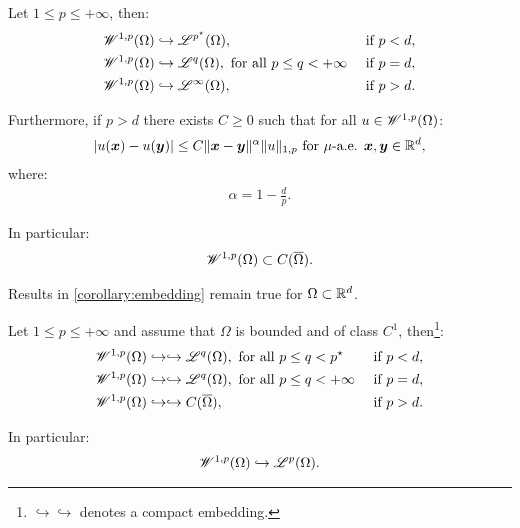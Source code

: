 \begin{corollary}
    Let $1 \leq p \leq +\infty$, then:
    \begin{align}
        & \mathscr{W}^{1, p}(\Omega) \hookrightarrow \mathscr{L}^{p^{\star}}(\Omega), & \text{ if } p < d, \\
        & \mathscr{W}^{1, p}(\Omega) \hookrightarrow \mathscr{L}^{q}(\Omega), \text{ for all } p \leq q < +\infty & \text{ if } p = d, \\
        & \mathscr{W}^{1, p}(\Omega) \hookrightarrow \mathscr{L}^{\infty}(\Omega), & \text{ if } p > d.
    \end{align}

    Furthermore, if $p > d$ there exists $C \geq 0$ such that for all $u \in \mathscr{W}^{1, p}(\Omega)$:
    \begin{gather}
        \lvert u(\bm{x}) - u(\bm{y}) \rvert \leq C \lVert \bm{x} - \bm{y} \rVert^{\alpha} \lVert u \rVert_{1, p} \text{ for } \mu \text{-a.e. } \bm{x}, \bm{y} \in \mathbb{R}^{d},
    \end{gather}
    where:
    \begin{gather}
        \alpha = 1 - \frac{d}{p}.
    \end{gather}

    In particular:
    \begin{gather}
        \mathscr{W}^{1, p}(\Omega) \subset C(\overline{\Omega}).
    \end{gather}
\end{corollary}

\begin{corollary}
    Results in \ref{corollary:embedding} remain true for $\Omega \subset \mathbb{R}^{d}$.
\end{corollary}

\begin{theorem}
    Let $1 \leq p \leq +\infty$ and assume that $\Omega$ is bounded and of class $C^1$, then\footnote{$\hookrightarrow \hookrightarrow$ denotes a compact embedding.}:
    \begin{align}
        & \mathscr{W}^{1, p}(\Omega) \hookrightarrow \hookrightarrow \mathscr{L}^{q}(\Omega), \text{ for all } p \leq q < p^{\star} & \text{ if } p < d, \\
        & \mathscr{W}^{1, p}(\Omega) \hookrightarrow \hookrightarrow \mathscr{L}^{q}(\Omega), \text{ for all } p \leq q < +\infty & \text{ if } p = d, \\
        & \mathscr{W}^{1, p}(\Omega) \hookrightarrow \hookrightarrow C(\overline{\Omega}), & \text{ if } p > d.
    \end{align}

    In particular:
    \begin{gather}
        \mathscr{W}^{1, p}(\Omega) \hookrightarrow \mathscr{L}^{p}(\Omega).
    \end{gather}
\end{theorem}

